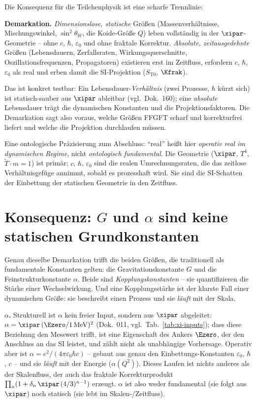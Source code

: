 Die Konsequenz für die Teilchenphysik ist eine scharfe Trennlinie:

\begin{prinzip}
\textbf{Demarkation.} \emph{Dimensionslose, statische} Größen
(Massenverhältnisse, Mischungswinkel, $\sin^2\theta_W$, die Koide-Größe $Q$) leben
vollständig in der $\xipar$-Geometrie -- ohne $c$, $\hbar$, $\varepsilon_0$ und
ohne fraktale Korrektur. \emph{Absolute, zeitausgedehnte} Größen (Lebensdauern,
Zerfallsraten, Wirkungsquerschnitte, Oszillationsfrequenzen, Propagatoren)
existieren erst im Zeitfluss, erfordern $c$, $\hbar$, $\varepsilon_0$ als real und
erben damit die SI-Projektion ($S_{\mathrm{T0}}$, $\Kfrak$).
\end{prinzip}

Das ist konkret testbar: Ein Lebensdauer-\emph{Verhältnis} (zwei Prozesse,
$\hbar$ kürzt sich) ist statisch-sauber aus $\xipar$ ableitbar (vgl.~Dok.~160);
eine \emph{absolute} Lebensdauer trägt die dynamischen Konstanten und die
Projektionsfaktoren. Die Demarkation sagt also voraus, welche Größen FFGFT scharf
und korrekturfrei liefert und welche die Projektion durchlaufen müssen.

Eine ontologische Präzisierung zum Abschluss: ``real'' heißt hier \emph{operativ
real im dynamischen Regime}, nicht \emph{ontologisch fundamental}. Die Geometrie
($\xipar$, $T^4$, $\tilde T\cdot m=1$) ist primär; $c$, $\hbar$, $\varepsilon_0$
sind die realen Umrechnungsraten, die das zeitlose Verhältnisgefüge annimmt,
sobald es prozesshaft wird. Sie sind die SI-Schatten der Einbettung der statischen
Geometrie in den Zeitfluss.

\section{Konsequenz: $G$ und $\alpha$ sind keine statischen Grundkonstanten}
\label{sec:G-alpha}

Genau dieselbe Demarkation trifft die beiden Größen, die traditionell als
fundamentale Konstanten gelten: die Gravitationskonstante $G$ und die
Feinstrukturkonstante $\alpha$. Beide sind \emph{Kopplungskonstanten} -- sie
quantifizieren die Stärke einer Wechselwirkung. Und eine Kopplungsstärke ist der
klarste Fall einer dynamischen Größe: sie beschreibt einen Prozess und sie
\emph{läuft} mit der Skala.

\textbf{$\alpha$.} Strukturell ist $\alpha$ kein freier Input, sondern aus
$\xipar$ abgeleitet: $\alpha=\xipar\,(\Ezero/1\,\mathrm{MeV})^2$ (Dok.~011,
vgl.~Tab.~\ref{tab:xi-inputs}); dass diese Beziehung den Messwert trifft, ist
eine Eigenschaft des Ankers $\Ezero$, der den Anschluss an das SI leistet, und
zählt nicht als unabhängige Vorhersage. Operativ aber ist
$\alpha=e^2/(4\pi\varepsilon_0\hbar c)$ -- gebaut aus genau den
Einbettungs-Konstanten $\varepsilon_0$, $\hbar$, $c$ -- und sie \emph{läuft} mit
der Energie ($\alpha(Q^2)$). Dieses Laufen ist nichts anderes als der
Skalenfluss, der auch das fraktale Korrekturprodukt
$\prod_n(1+\delta_n\,\xipar\,(4/3)^{n-1})$ erzeugt. $\alpha$ ist also weder
fundamental (sie folgt aus $\xipar$) noch statisch (sie lebt im
Skalen-/Zeitfluss).

